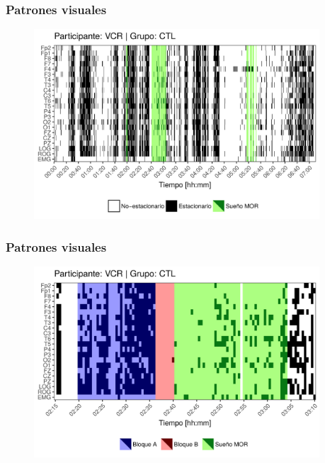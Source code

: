 \documentclass[serif,mathserif,professionalfont]{beamer}
\begin{document}
\begin{frame}\frametitle{Patrones visuales}
\begin{figure}
\includegraphics[width=0.95\textwidth]
{./img_art_dfa/zoom_noVCR_v2.png}
\end{figure}
\end{frame}

\begin{frame}\frametitle{Patrones visuales}
\begin{figure}
\includegraphics[width=0.95\textwidth]
{./img_art_dfa/zoom_siVCR_v2.png}
\end{figure}
\end{frame}
\end{document}
